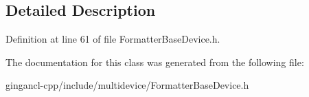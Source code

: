 \subsection{Detailed Description}




Definition at line 61 of file FormatterBaseDevice.h.

The documentation for this class was generated from the following file:\begin{CompactItemize}
\item 
gingancl-cpp/include/multidevice/FormatterBaseDevice.h\end{CompactItemize}

